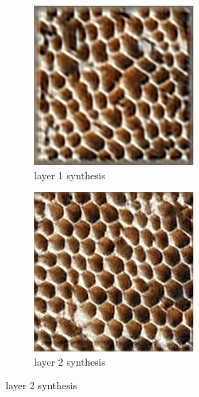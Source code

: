 \documentclass[11pt, oneside]{article}   	%
\begin{document}
\begin{figure}[H]
    \centering
    \begin{subfigure}[b]{0.45\textwidth}
        \includegraphics[width=\textwidth]{figure/beehive/layer_01_001}
        \caption{layer 1 synthesis}
    \end{subfigure}
    \begin{subfigure}[b]{0.45\textwidth}
        \includegraphics[width=\textwidth]{figure/beehive/layer_02_001}
        \caption{layer 2 synthesis}
    \end{subfigure}
    

\end{figure}
\end{document}
